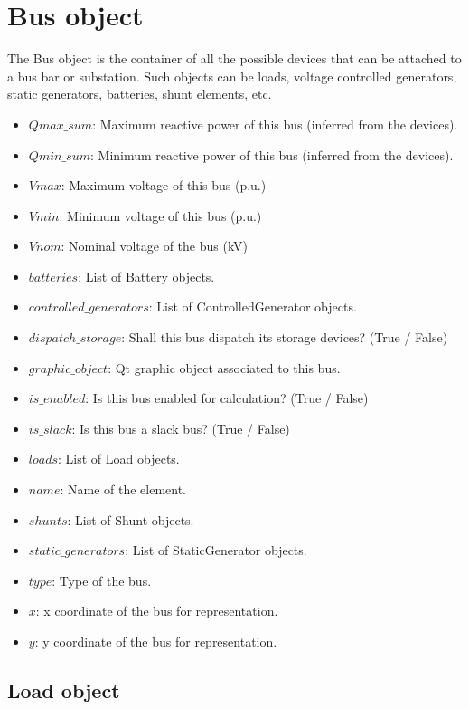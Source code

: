 \documentclass[11pt,fleqn]{book} %
\begin{document}
\section{Bus object}

The Bus object is the container of all the possible devices that can be attached to a bus bar or substation. Such objects can be loads, voltage controlled generators, static generators, batteries, shunt elements, etc.

\begin{itemize}
	\item $Qmax\_sum$: Maximum reactive power of this bus (inferred from the devices).
	\item $Qmin\_sum$: Minimum reactive power of this bus (inferred from the devices).
	\item $Vmax$: Maximum voltage of this bus (p.u.)
	\item $Vmin$: Minimum voltage of this bus (p.u.)
	\item $Vnom$: Nominal voltage of the bus (kV)
	\item $batteries$: List of Battery objects.
	\item $controlled\_generators$: List of ControlledGenerator objects.
	\item $dispatch\_storage$: Shall this bus dispatch its storage devices?  (True / False)
	\item $graphic\_object$: Qt graphic object associated to this bus.
	\item $is\_enabled$: Is this bus enabled for calculation? (True / False)
	\item $is\_slack$: Is this bus a slack bus? (True / False)
	\item $loads$: List of Load objects.
	\item $name$: Name of the element.
	\item $shunts$: List of Shunt objects.
	\item $static\_generators$: List of StaticGenerator objects.
	\item $type$: Type of the bus.
	\item $x$: x coordinate of the bus for representation.
	\item $y$: y coordinate of the bus for representation.
\end{itemize}


\subsection{Load object}
\end{document}
